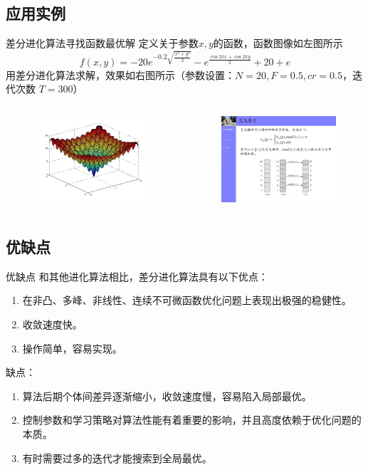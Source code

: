 \subsection{应用实例}
	\begin{frame}{差分进化算法寻找函数最优解}
	定义关于参数$x, y$的函数，函数图像如左图所示
	$$f(x,y)=-20e^{-0.2\sqrt{\frac{x^2+y^2}{2}}}-e^{\frac{\cos2\pi x+\cos2\pi y}{2}}+20+e$$
	用差分进化算法求解，效果如右图所示（参数设置：$N=20, F=0.5, cr=0.5$，迭代次数 $T=300$）
	\begin{columns}
		\begin{column}{0.45\textwidth}
			\begin{figure}
				\vspace{-0.8cm}
				\includegraphics [width =2.0in]{../images/function.png}
			\end{figure}
		\end{column}
		\begin{column}{0.55\textwidth}
			\begin{figure}
				\includegraphics [width =2.0in]{../images/curve.png}
			\end{figure}
		\end{column}
	\end{columns}
\end{frame}

\subsection{优缺点}
\begin{frame}{优缺点}
和其他进化算法相比，差分进化算法具有以下优点：
	\begin{enumerate}
		\item 在非凸、多峰、非线性、连续不可微函数优化问题上表现出极强的稳健性。
		\item 收敛速度快。
		\item 操作简单，容易实现。
	\end{enumerate}
	缺点：
	\begin{enumerate}
		\item 算法后期个体间差异逐渐缩小，收敛速度慢，容易陷入局部最优。
		\item 控制参数和学习策略对算法性能有着重要的影响，并且高度依赖于优化问题的本质。
		\item 有时需要过多的迭代才能搜索到全局最优。
	\end{enumerate}
\end{frame}


